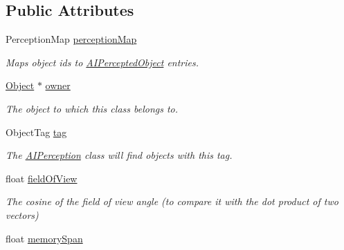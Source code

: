 \subsection*{\-Public \-Attributes}
\begin{DoxyCompactItemize}
\item 
\hypertarget{classAIPerception_a44062bea501fad232dfa24f0c71ea5b4}{
\-Perception\-Map \hyperlink{classAIPerception_a44062bea501fad232dfa24f0c71ea5b4}{perception\-Map}}
\label{d4/d0b/classAIPerception_a44062bea501fad232dfa24f0c71ea5b4}

\begin{DoxyCompactList}\small\item\em \-Maps object ids to \hyperlink{classAIPerceptedObject}{\-A\-I\-Percepted\-Object} entries. \end{DoxyCompactList}\item 
\hypertarget{classAIPerception_a081f61b494e193c528b6fb9562c1d050}{
\hyperlink{classObject}{\-Object} $\ast$ \hyperlink{classAIPerception_a081f61b494e193c528b6fb9562c1d050}{owner}}
\label{d4/d0b/classAIPerception_a081f61b494e193c528b6fb9562c1d050}

\begin{DoxyCompactList}\small\item\em \-The object to which this class belongs to. \end{DoxyCompactList}\item 
\hypertarget{classAIPerception_a03846948a5a7d9ea6043b67b28172e78}{
\-Object\-Tag \hyperlink{classAIPerception_a03846948a5a7d9ea6043b67b28172e78}{tag}}
\label{d4/d0b/classAIPerception_a03846948a5a7d9ea6043b67b28172e78}

\begin{DoxyCompactList}\small\item\em \-The \hyperlink{classAIPerception}{\-A\-I\-Perception} class will find objects with this tag. \end{DoxyCompactList}\item 
\hypertarget{classAIPerception_a58033209cd3ef65646a7e3296b5f7530}{
float \hyperlink{classAIPerception_a58033209cd3ef65646a7e3296b5f7530}{field\-Of\-View}}
\label{d4/d0b/classAIPerception_a58033209cd3ef65646a7e3296b5f7530}

\begin{DoxyCompactList}\small\item\em \-The cosine of the field of view angle (to compare it with the dot product of two vectors) \end{DoxyCompactList}\item 
\hypertarget{classAIPerception_a465a687df63900dab25613b7dceba964}{
float \hyperlink{classAIPerception_a465a687df63900dab25613b7dceba964}{memory\-Span}}
\label{d4/d0b/classAIPerception_a465a687df63900dab25613b7dceba964}


\end{DoxyCompactItemize}
